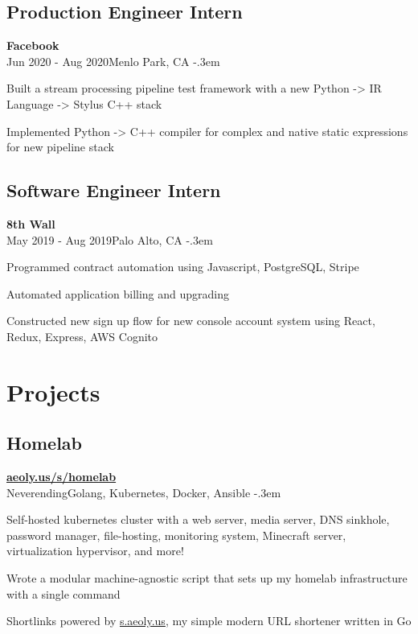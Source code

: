 \documentclass{article}
\let\olditemize=\itemize \let\endolditemize=\enditemize
\renewenvironment{itemize}{\olditemize[topsep=0em] \itemsep-.3em}{\endolditemize}
\newcommand{\link}[1]{\href{https://#1}{#1}}
\newcommand{\entry}[3]{\quad\textbf{#1}\\#2\qquad#3}
\begin{document}
\subsection{Production Engineer Intern}
\entry{Facebook}{Jun 2020 - Aug 2020}{Menlo Park, CA}
\begin{itemize}
  \item Built a stream processing pipeline test framework with a new Python -> IR Language -> Stylus C++ stack
  \item Implemented Python -> C++ compiler for complex and native static expressions for new pipeline stack
\end{itemize}

\subsection{Software Engineer Intern}
\entry{8th Wall}{May 2019 - Aug 2019}{Palo Alto, CA}
\begin{itemize}
  \item Programmed contract automation using Javascript, PostgreSQL, Stripe
  \item Automated application billing and upgrading
  \item Constructed new sign up flow for new console account system using
    React, Redux, Express, AWS Cognito
\end{itemize}


\section{Projects}

\subsection{Homelab}
\entry{\link{aeoly.us/s/homelab}}
  {Neverending}{Golang, Kubernetes, Docker, Ansible}
\begin{itemize}
  \item Self-hosted kubernetes cluster with a web server, media server, DNS
    sinkhole, password manager, file-hosting, monitoring system, Minecraft
    server, virtualization hypervisor, and more!
  \item Wrote a modular machine-agnostic script that sets up my homelab
    infrastructure with a single command
  \item Shortlinks powered by \link{s.aeoly.us}, my simple modern URL shortener
    written in Go
\end{itemize}
\end{document}
